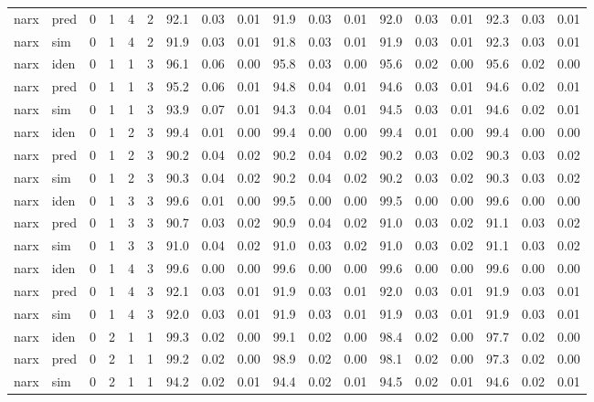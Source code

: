 \begin{landscape}
\begin{center}
\begin{longtable}{ll|cccc|ccc|ccc|ccc|ccc}
narx & pred & 0 & 1 & 4 & 2 & 92.1 & 0.03 & 0.01 & 91.9 & 0.03 & 0.01 & 92.0 & 0.03 & 0.01 & 92.3 & 0.03 & 0.01 \\ 
narx & sim  & 0 & 1 & 4 & 2 & 91.9 & 0.03 & 0.01 & 91.8 & 0.03 & 0.01 & 91.9 & 0.03 & 0.01 & 92.3 & 0.03 & 0.01 \\ 
 \hline 
narx & iden & 0 & 1 & 1 & 3 & 96.1 & 0.06 & 0.00 & 95.8 & 0.03 & 0.00 & 95.6 & 0.02 & 0.00 & 95.6 & 0.02 & 0.00 \\ 
narx & pred & 0 & 1 & 1 & 3 & 95.2 & 0.06 & 0.01 & 94.8 & 0.04 & 0.01 & 94.6 & 0.03 & 0.01 & 94.6 & 0.02 & 0.01 \\ 
narx & sim  & 0 & 1 & 1 & 3 & 93.9 & 0.07 & 0.01 & 94.3 & 0.04 & 0.01 & 94.5 & 0.03 & 0.01 & 94.6 & 0.02 & 0.01 \\ 
 \hline 
narx & iden & 0 & 1 & 2 & 3 & 99.4 & 0.01 & 0.00 & 99.4 & 0.00 & 0.00 & 99.4 & 0.01 & 0.00 & 99.4 & 0.00 & 0.00 \\ 
narx & pred & 0 & 1 & 2 & 3 & 90.2 & 0.04 & 0.02 & 90.2 & 0.04 & 0.02 & 90.2 & 0.03 & 0.02 & 90.3 & 0.03 & 0.02 \\ 
narx & sim  & 0 & 1 & 2 & 3 & 90.3 & 0.04 & 0.02 & 90.2 & 0.04 & 0.02 & 90.2 & 0.03 & 0.02 & 90.3 & 0.03 & 0.02 \\ 
 \hline 
narx & iden & 0 & 1 & 3 & 3 & 99.6 & 0.01 & 0.00 & 99.5 & 0.00 & 0.00 & 99.5 & 0.00 & 0.00 & 99.6 & 0.00 & 0.00 \\ 
narx & pred & 0 & 1 & 3 & 3 & 90.7 & 0.03 & 0.02 & 90.9 & 0.04 & 0.02 & 91.0 & 0.03 & 0.02 & 91.1 & 0.03 & 0.02 \\ 
narx & sim  & 0 & 1 & 3 & 3 & 91.0 & 0.04 & 0.02 & 91.0 & 0.03 & 0.02 & 91.0 & 0.03 & 0.02 & 91.1 & 0.03 & 0.02 \\ 
 \hline 
narx & iden & 0 & 1 & 4 & 3 & 99.6 & 0.00 & 0.00 & 99.6 & 0.00 & 0.00 & 99.6 & 0.00 & 0.00 & 99.6 & 0.00 & 0.00 \\ 
narx & pred & 0 & 1 & 4 & 3 & 92.1 & 0.03 & 0.01 & 91.9 & 0.03 & 0.01 & 92.0 & 0.03 & 0.01 & 91.9 & 0.03 & 0.01 \\ 
narx & sim  & 0 & 1 & 4 & 3 & 92.0 & 0.03 & 0.01 & 91.9 & 0.03 & 0.01 & 91.9 & 0.03 & 0.01 & 91.9 & 0.03 & 0.01 \\ 
 \hline 
narx & iden & 0 & 2 & 1 & 1 & 99.3 & 0.02 & 0.00 & 99.1 & 0.02 & 0.00 & 98.4 & 0.02 & 0.00 & 97.7 & 0.02 & 0.00 \\ 
narx & pred & 0 & 2 & 1 & 1 & 99.2 & 0.02 & 0.00 & 98.9 & 0.02 & 0.00 & 98.1 & 0.02 & 0.00 & 97.3 & 0.02 & 0.00 \\ 
narx & sim  & 0 & 2 & 1 & 1 & 94.2 & 0.02 & 0.01 & 94.4 & 0.02 & 0.01 & 94.5 & 0.02 & 0.01 & 94.6 & 0.02 & 0.01 \\ 

\end{longtable}
\end{center}
\end{landscape}
